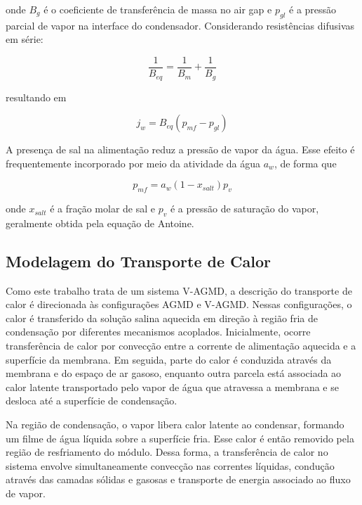 onde $B_g$ é o coeficiente de transferência de massa no air gap e $p_{gl}$ é a pressão parcial de vapor na interface do condensador. Considerando resistências difusivas em série:

\begin{equation}
\frac{1}{B_{eq}} = \frac{1}{B_m} + \frac{1}{B_g}
\end{equation}

resultando em

\begin{equation}
j_w = B_{eq} (p_{mf} - p_{gl})
\end{equation}

A presença de sal na alimentação reduz a pressão de vapor da água. Esse efeito é frequentemente incorporado por meio da atividade da água $a_w$, de forma que

\begin{equation}
p_{mf} = a_w (1 - x_{salt}) p_v
\end{equation}

onde $x_{salt}$ é a fração molar de sal e $p_v$ é a pressão de saturação do vapor, geralmente obtida pela equação de Antoine.

\subsection{Modelagem do Transporte de Calor}

Como este trabalho trata de um sistema V-AGMD, a descrição do transporte de calor é direcionada às configurações AGMD e V-AGMD. Nessas configurações, o calor é transferido da solução salina aquecida em direção à região fria de condensação por diferentes mecanismos acoplados. Inicialmente, ocorre transferência de calor por convecção entre a corrente de alimentação aquecida e a superfície da membrana. Em seguida, parte do calor é conduzida através da membrana e do espaço de ar gasoso, enquanto outra parcela está associada ao calor latente transportado pelo vapor de água que atravessa a membrana e se desloca até a superfície de condensação.

Na região de condensação, o vapor libera calor latente ao condensar, formando um filme de água líquida sobre a superfície fria. Esse calor é então removido pela região de resfriamento do módulo. Dessa forma, a transferência de calor no sistema envolve simultaneamente convecção nas correntes líquidas, condução através das camadas sólidas e gasosas e transporte de energia associado ao fluxo de vapor.


